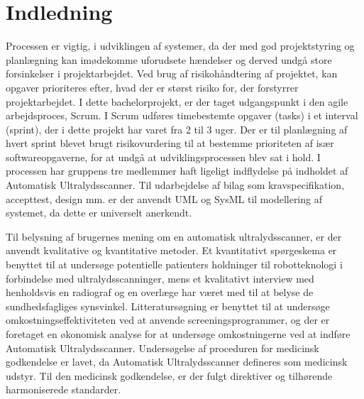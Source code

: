 \chapter{Indledning}\label{kapInd}
Processen er vigtig, i udviklingen af systemer, da der med god projektstyring og planlægning kan imødekomme uforudsete hændelser og derved undgå store forsinkelser i projektarbejdet. Ved brug af risikohåndtering af projektet, kan opgaver prioriteres efter, hvad der er størst risiko for, der forstyrrer projektarbejdet. I dette bachelorprojekt, er der taget udgangspunkt i den agile arbejdsproces, Scrum. I Scrum udføres timebestemte opgaver (tasks) i et interval (sprint), der i dette projekt har varet fra 2 til 3 uger. Der er til planlægning af hvert sprint blevet brugt risikovurdering til at bestemme prioriteten af især softwareopgaverne, for at undgå at udviklingsprocessen blev sat i hold. 
I processen har gruppens tre medlemmer haft ligeligt indflydelse på indholdet af Automatisk Ultralydsscanner. Til udarbejdelse af bilag som kravspecifikation, accepttest, design mm. er der anvendt UML og SysML til modellering af systemet, da dette er universelt anerkendt.

Til belysning af brugernes mening om en automatisk ultralydsscanner, er der anvendt kvalitative og kvantitative metoder. Et kvantitativt spørgeskema er benyttet til at undersøge potentielle patienters
holdninger til robotteknologi i forbindelse med ultralydsscanninger, mens et kvalitativt
interview med henholdsvis en radiograf og en overlæge har været med til at belyse de sundhedsfagliges
synsvinkel. Litteratursøgning er benyttet til at undersøge omkostningseffektiviteten ved at anvende screeningsprogrammer, og der er foretaget en økonomisk analyse for at undersøge omkostningerne ved at indføre Automatisk Ultralydsscanner. Undersøgelse af proceduren for medicinsk godkendelse er lavet, da Automatisk Ultralydsscanner defineres som medicinsk udstyr. Til den medicinsk godkendelse, er der fulgt direktiver og tilhørende harmoniserede standarder. 



